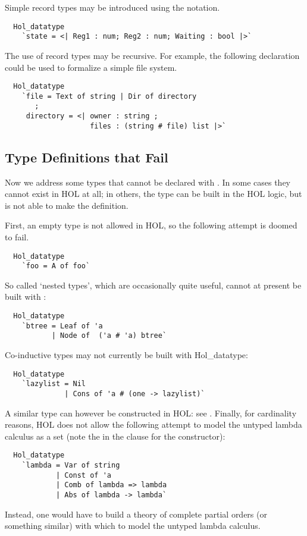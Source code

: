 %
Simple record types may be introduced using the  notation.
%
\begin{hol}
\begin{verbatim}
  Hol_datatype 
    `state = <| Reg1 : num; Reg2 : num; Waiting : bool |>`
\end{verbatim}
\end{hol}
%
The use of record types may be recursive. For example, the following
declaration could be used to formalize a simple file system.
%
\begin{hol}
\begin{verbatim}
  Hol_datatype
    `file = Text of string | Dir of directory
       ;
     directory = <| owner : string ;
                    files : (string # file) list |>`
\end{verbatim}
\end{hol}

\subsection{Type Definitions that Fail}

 Now we address some types that cannot be declared with .
In some cases they cannot exist in HOL at all; in others, the type
can be built in the HOL logic, but  is not able to make
the definition.

First, an empty type is not allowed in HOL, so the following attempt
is doomed to fail.
%
\begin{hol}
\begin{verbatim}
  Hol_datatype
    `foo = A of foo`
\end{verbatim}
\end{hol}
% 
So called `nested types', which are occasionally quite useful, cannot
at present be built with :
%
\begin{hol}
\begin{verbatim}
  Hol_datatype 
    `btree = Leaf of 'a
           | Node of  ('a # 'a) btree`
\end{verbatim}
\end{hol}
% 
Co-inductive types may not currently be built with {Hol\_datatype}:
%
\begin{hol}
\begin{verbatim}
  Hol_datatype 
    `lazylist = Nil
              | Cons of 'a # (one -> lazylist)`
\end{verbatim}
\end{hol}
% 
A similar type can however be constructed in HOL: see .
%
Finally, for cardinality reasons, HOL does not allow the following attempt
to model the untyped lambda calculus as a set (note 
the \holtxt{->} in the clause for the  constructor):
%
\begin{hol}
\begin{verbatim}
  Hol_datatype 
    `lambda = Var of string
            | Const of 'a
            | Comb of lambda => lambda
            | Abs of lambda -> lambda`
\end{verbatim}
\end{hol}
% 
Instead, one would have to build a theory of complete partial orders
(or something similar) with which to model the untyped lambda calculus.

